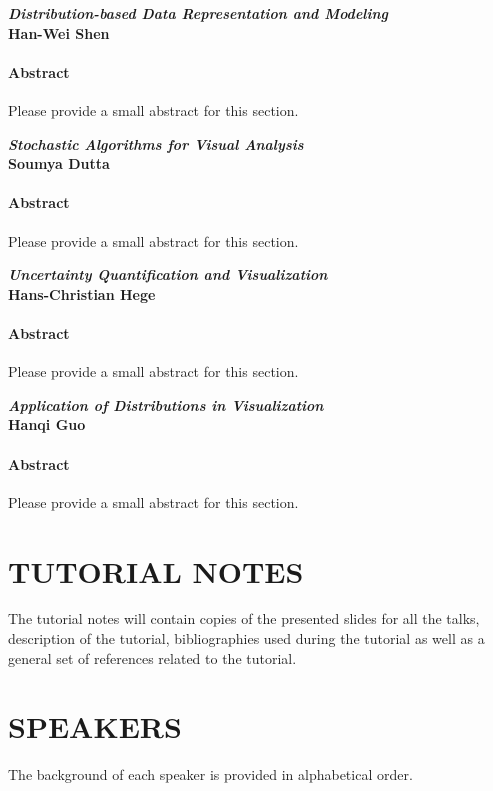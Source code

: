 \documentclass[preprint,journal]{vgtc}       %
\newcommand{\addverticalspace}{\vspace{3mm}}
\begin{document}
\noindent\textbf{\textit{Distribution-based Data Representation and Modeling}}\\
\textbf{Han-Wei Shen}
\paragraph{Abstract}
Please provide a small abstract for this section.

\addverticalspace

\noindent\textbf{\textit{Stochastic Algorithms for Visual Analysis}}\\
\textbf{Soumya Dutta}
\paragraph{Abstract}
Please provide a small abstract for this section.

\addverticalspace

\noindent\textbf{\textit{Uncertainty Quantification and Visualization}}\\
\textbf{Hans-Christian Hege}
\paragraph{Abstract}
Please provide a small abstract for this section.

\addverticalspace

\noindent\textbf{\textit{Application of Distributions in Visualization}}\\
\textbf{Hanqi Guo}
\paragraph{Abstract}
Please provide a small abstract for this section.

\addverticalspace

\section*{TUTORIAL NOTES}

The tutorial notes will contain copies of the presented slides for all the talks, description of the tutorial,  bibliographies used during the tutorial as well as a general set of references related to the tutorial.

\section*{SPEAKERS}
The background of each speaker is provided in alphabetical order.
\end{document}
